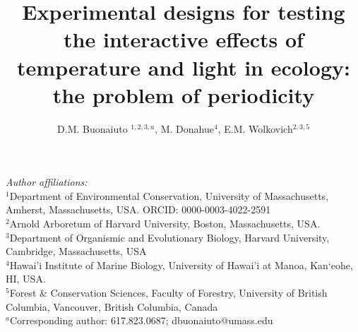 \documentclass[11pt]{article}
\title{Experimental designs for testing the interactive effects of temperature and light in ecology: the problem of periodicity }
\date{}
\author{D.M. Buonaiuto $^{1,2,3,a}$, M. Donahue$^{4}$, E.M. Wolkovich$^{2,3,5}$}
\begin{document}
\maketitle
\noindent \emph{Author affiliations:}\\
\noindent $^1$Department of Environmental Conservation, University of Massachusetts, Amherst, Massachusetts, USA. ORCID: 0000-0003-4022-2591\\
\noindent $^2$Arnold Arboretum of Harvard University, Boston, Massachusetts, USA.\\
$^3$Department of Organismic and Evolutionary Biology, Harvard University, Cambridge, Massachusetts, USA \\
$^4$Hawai'i Institute of Marine Biology, University of Hawai'i at Manoa, Kan‘eohe, HI, USA.\\
$^5$Forest \& Conservation Sciences, Faculty of Forestry, University of British Columbia, Vancouver, British Columbia, Canada\\
$^a$Corresponding author: 617.823.0687; dbuonaiuto@umass.edu\\
\pagebreak
\maketitle
\end{document}
